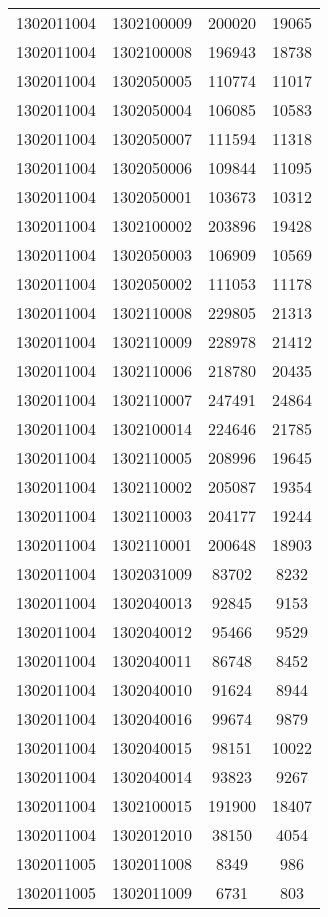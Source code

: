 \begin{longtable}[h]{llcc}
		1302011004 & 1302100009 & 200020 & 19065\\
		1302011004 & 1302100008 & 196943 & 18738\\
		1302011004 & 1302050005 & 110774 & 11017\\
		1302011004 & 1302050004 & 106085 & 10583\\
		1302011004 & 1302050007 & 111594 & 11318\\
		1302011004 & 1302050006 & 109844 & 11095\\
		1302011004 & 1302050001 & 103673 & 10312\\
		1302011004 & 1302100002 & 203896 & 19428\\
		1302011004 & 1302050003 & 106909 & 10569\\
		1302011004 & 1302050002 & 111053 & 11178\\
		1302011004 & 1302110008 & 229805 & 21313\\
		1302011004 & 1302110009 & 228978 & 21412\\
		1302011004 & 1302110006 & 218780 & 20435\\
		1302011004 & 1302110007 & 247491 & 24864\\
		1302011004 & 1302100014 & 224646 & 21785\\
		1302011004 & 1302110005 & 208996 & 19645\\
		1302011004 & 1302110002 & 205087 & 19354\\
		1302011004 & 1302110003 & 204177 & 19244\\
		1302011004 & 1302110001 & 200648 & 18903\\
		1302011004 & 1302031009 & 83702 & 8232\\
		1302011004 & 1302040013 & 92845 & 9153\\
		1302011004 & 1302040012 & 95466 & 9529\\
		1302011004 & 1302040011 & 86748 & 8452\\
		1302011004 & 1302040010 & 91624 & 8944\\
		1302011004 & 1302040016 & 99674 & 9879\\
		1302011004 & 1302040015 & 98151 & 10022\\
		1302011004 & 1302040014 & 93823 & 9267\\
		1302011004 & 1302100015 & 191900 & 18407\\
		1302011004 & 1302012010 & 38150 & 4054\\
		1302011005 & 1302011008 & 8349 & 986\\
		1302011005 & 1302011009 & 6731 & 803\\

\end{longtable}
